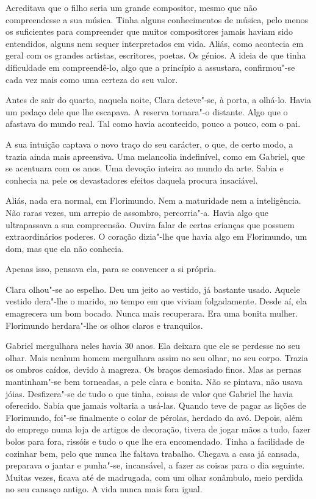 Acreditava que o filho seria um grande compositor, mesmo que não
compreendesse a sua música. Tinha alguns conhecimentos de música, pelo
menos os suficientes para compreender que muitos compositores jamais
haviam sido entendidos, alguns nem sequer interpretados em vida. Aliás,
como acontecia em geral com os grandes artistas, escritores, poetas. Os
génios. A ideia de que tinha dificuldade em compreendê-lo, algo que a
princípio a assustara, confirmou"-se cada vez mais como uma certeza do
seu valor.

Antes de sair do quarto, naquela noite, Clara deteve"-se, à porta, a
olhá-lo. Havia um pedaço dele que lhe escapava. A reserva tornara"-o
distante. Algo que o afastava do mundo real. Tal como havia acontecido,
pouco a pouco, com o pai.

A sua intuição captava o novo traço do seu carácter, o que, de certo
modo, a trazia ainda mais apreensiva. Uma melancolia indefinível, como
em Gabriel, que se acentuara com os anos. Uma devoção inteira ao mundo
da arte. Sabia e conhecia na pele os devastadores efeitos daquela
procura insaciável.

Aliás, nada era normal, em Florimundo. Nem a maturidade nem a
inteligência. Não raras vezes, um arrepio de assombro, percorria"-a.
Havia algo que ultrapassava a sua compreensão. Ouvira falar de certas
crianças que possuem extraordinários poderes. O coração dizia"-lhe que
havia algo em Florimundo, um dom, mas que ela não conhecia.

Apenas isso, pensava ela, para se convencer a si própria.

Clara olhou"-se ao espelho. Deu um jeito ao vestido, já bastante usado.
Aquele vestido dera"-lhe o marido, no tempo em que viviam folgadamente.
Desde aí, ela emagrecera um bom bocado. Nunca mais recuperara. Era uma
bonita mulher. Florimundo herdara"-lhe os olhos claros e tranquilos.

Gabriel mergulhara neles havia 30 anos. Ela deixara que ele se perdesse
no seu olhar. Mais nenhum homem mergulhara assim no seu olhar, no seu
corpo. Trazia os ombros caídos, devido à magreza. Os braços demasiado
finos. Mas as pernas mantinham"-se bem torneadas, a pele clara e bonita.
Não se pintava, não usava jóias. Desfizera"-se de tudo o que tinha,
coisas de valor que Gabriel lhe havia oferecido. Sabia que jamais
voltaria a usá-las. Quando teve de pagar as lições de Florimundo, foi"-se
finalmente o colar de pérolas, herdado da avó. Depois, além do emprego
numa loja de artigos de decoração, tivera de jogar mãos a tudo, fazer
bolos para fora, rissóis e tudo o que lhe era encomendado. Tinha a
facilidade de cozinhar bem, pelo que nunca lhe faltava trabalho. Chegava
a casa já cansada, preparava o jantar e punha"-se, incansável, a fazer as
coisas para o dia seguinte. Muitas vezes, ficava até de madrugada, com
um olhar sonâmbulo, meio perdida no seu cansaço antigo. A vida nunca
mais fora igual.

